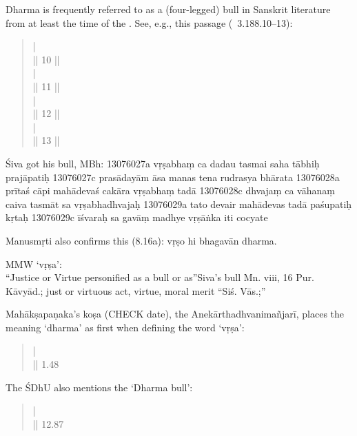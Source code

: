 \documentclass[11pt]{book}
\begin{document}
Dharma is frequently referred to as a (four-legged) 
bull in Sanskrit literature from at least the time of the \MBh. 
See, e.g., this passage (\MBH\ 3.188.10--13):

\begin{quote}
{\small
   |\\
   || 10 ||\\
   |\\
   || 11 ||\\
   |\\
   || 12 ||\\
   |\\
   || 13 ||\\
  }
\end{quote}

Śiva got his bull, MBh:
13076027a vṛṣabhaṃ ca dadau tasmai saha tābhiḥ prajāpatiḥ
13076027c prasādayām āsa manas tena rudrasya bhārata
13076028a prītaś cāpi mahādevaś cakāra vṛṣabhaṃ tadā
13076028c dhvajaṃ ca vāhanaṃ caiva tasmāt sa vṛṣabhadhvajaḥ
13076029a tato devair mahādevas tadā paśupatiḥ kṛtaḥ
13076029c īśvaraḥ sa gavāṃ madhye vṛṣāṅka iti cocyate


Manusmṛti also confirms this (8.16a): vṛṣo hi bhagavān dharma.

MMW `vṛṣa':\\
``Justice or Virtue personified as a bull or as''Siva's bull Mn. viii,
16 Pur. Kāvyād.; just or virtuous act, virtue, moral merit ``Siś.
Vās.;''

Mahākṣapaṇaka's koṣa (CHECK date), the Anekārthadhvanimañjarī, places
the meaning `dharma' as first when defining the word `vṛṣa':

\begin{quote}
     |\\
     || 1.48
    \end{quote}

The ŚDhU also mentions the `Dharma bull':

\begin{quote}
     |\\
     || 12.87
\end{quote}
\end{document}
